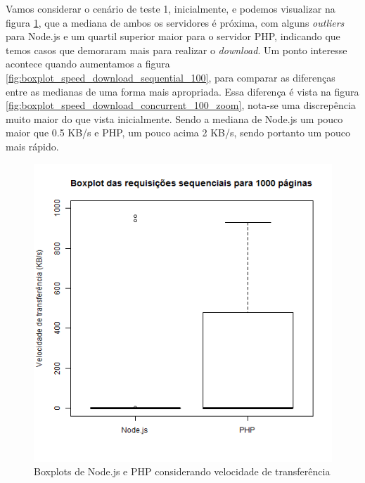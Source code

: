 \documentclass[conference,compsoc]{IEEEtran}
\begin{document}

Vamos considerar o cenário de teste 1, inicialmente, e podemos visualizar na figura \ref{fig:boxplot_speed_download_concurrent_100}, que a mediana de ambos os servidores é próxima, com alguns \textit{outliers} para Node.js e um quartil superior maior para o servidor PHP, indicando que temos casos que demoraram mais para realizar o \textit{download}. Um ponto interesse acontece quando aumentamos a figura \ref{fig:boxplot_speed_download_sequential_100}, para comparar as diferenças entre as medianas de uma forma mais apropriada. Essa diferença é vista na figura \ref{fig:boxplot_speed_download_concurrent_100_zoom}, nota-se uma discrepência muito maior do que vista inicialmente. Sendo a mediana de Node.js um pouco maior que 0.5 KB/s e PHP, um pouco acima 2 KB/s, sendo portanto um pouco mais rápido. 

\begin{figure}[h!]
\centering
  \includegraphics[scale=0.35]{plots/boxplots/concurrent/SPEED_DOWNLOAD/boxplot_SPEED_DOWNLOAD_1000_pages_processed.png}
  \caption{Boxplots de Node.js e PHP considerando velocidade de transferência}
    \label{fig:boxplot_speed_download_concurrent_100}
\end{figure}
\end{document}
